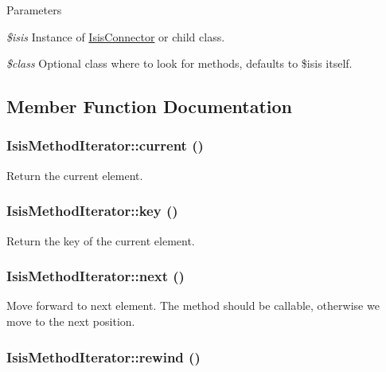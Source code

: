 \begin{DoxyParams}{Parameters}
\item[{\em \$isis}]Instance of \hyperlink{classIsisConnector}{IsisConnector} or child class.\item[{\em \$class}]Optional class where to look for methods, defaults to \$isis itself. \end{DoxyParams}


\subsection{Member Function Documentation}
\hypertarget{classIsisMethodIterator_a1d7236d349cd282c4c0ff6ec8f186e93}{
\subsubsection[{current}]{\setlength{\rightskip}{0pt plus 5cm}IsisMethodIterator::current ()}}
\label{classIsisMethodIterator_a1d7236d349cd282c4c0ff6ec8f186e93}
Return the current element. \hypertarget{classIsisMethodIterator_ad750f5dd57dcb6480f64f9ac703492fc}{
\subsubsection[{key}]{\setlength{\rightskip}{0pt plus 5cm}IsisMethodIterator::key ()}}
\label{classIsisMethodIterator_ad750f5dd57dcb6480f64f9ac703492fc}
Return the key of the current element. \hypertarget{classIsisMethodIterator_a8a02e17d6597ba1f199bd82ab9fc1b32}{
\subsubsection[{next}]{\setlength{\rightskip}{0pt plus 5cm}IsisMethodIterator::next ()}}
\label{classIsisMethodIterator_a8a02e17d6597ba1f199bd82ab9fc1b32}
Move forward to next element. The method should be callable, otherwise we move to the next position. \hypertarget{classIsisMethodIterator_a1a0ee1617a50e6aa57fe80cd0c2023df}{
\subsubsection[{rewind}]{\setlength{\rightskip}{0pt plus 5cm}IsisMethodIterator::rewind ()}}
